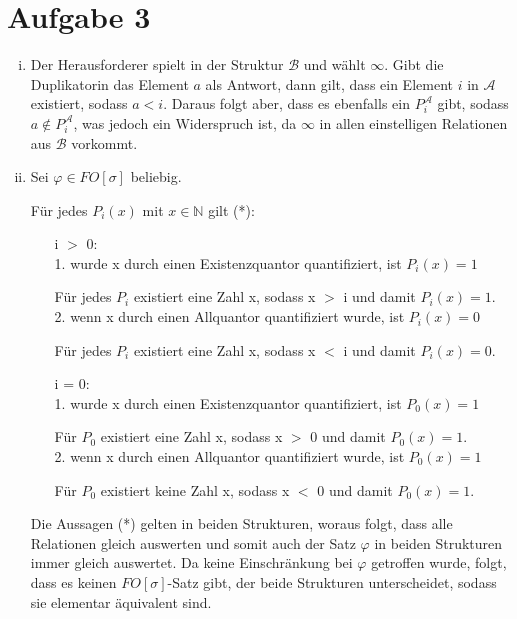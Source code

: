 \documentclass[a4paper,10pt]{article}
\begin{document}
\section*{Aufgabe 3}
	\begin{enumerate}[(i)]
		\item
			Der Herausforderer spielt in der Struktur $\mathcal{B}$ und wählt $\infty$. Gibt die Duplikatorin das Element $a$ als Antwort, dann 					gilt, dass ein Element $i$ in $\mathcal{A}$ existiert, sodass $a < i$. Daraus folgt aber, dass es ebenfalls ein $P_i^{\mathcal{A}}$ 					gibt, sodass $a \notin P_i^{\mathcal{A}}$, was jedoch ein Widerspruch ist, da $\infty$ in allen einstelligen Relationen aus 						$\mathcal{B}$ vorkommt.
		\item
			Sei $\varphi \in FO[\sigma]$ beliebig.
			
			Für jedes $P_i(x)$ mit $x \in \mathbb{N}$ gilt (*): \\
			\begin{itemize}
				\item[i $>$ 0:] ~\\
					1. wurde x durch einen Existenzquantor quantifiziert, ist $P_i(x) = 1$
				
					Für jedes $P_i$ existiert eine Zahl x, sodass x $>$ i und damit $P_i(x) = 1$. \\
					
					2. wenn x durch einen Allquantor quantifiziert wurde, ist $P_i(x) = 0$
					
					Für jedes $P_i$ existiert eine Zahl x, sodass x $<$ i und damit $P_i(x) = 0$. \\
						
				\item[i = 0:] ~\\
					1. wurde x durch einen Existenzquantor quantifiziert, ist $P_0(x) = 1$
				
					Für $P_0$ existiert eine Zahl x, sodass x $>$ 0 und damit $P_0(x) = 1$. \\
					
					2. wenn x durch einen Allquantor quantifiziert wurde, ist $P_0(x) = 1$
					
					Für $P_0$ existiert keine Zahl x, sodass x $<$ 0 und damit $P_0(x) = 1$. \\
			\end{itemize}
			
			Die Aussagen (*) gelten in beiden Strukturen, woraus folgt, dass alle Relationen gleich auswerten und somit auch der Satz $\varphi$ 				in beiden Strukturen immer gleich auswertet. Da keine Einschränkung bei $\varphi$ getroffen wurde, folgt, dass es keinen 							$FO[\sigma]$-Satz gibt, der beide Strukturen unterscheidet, sodass sie elementar äquivalent sind.


\end{enumerate}
\end{document}
